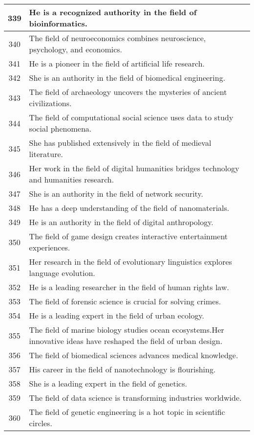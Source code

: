 \begin{longtable}{|c|p{12cm}|}
339 & He is a recognized authority in the field of bioinformatics. \\ \hline
340 & The field of neuroeconomics combines neuroscience, psychology, and economics. \\ \hline
341 & He is a pioneer in the field of artificial life research. \\ \hline
342 & She is an authority in the field of biomedical engineering. \\ \hline
343 & The field of archaeology uncovers the mysteries of ancient civilizations. \\ \hline
344 & The field of computational social science uses data to study social phenomena. \\ \hline
345 & She has published extensively in the field of medieval literature. \\ \hline
346 & Her work in the field of digital humanities bridges technology and humanities research. \\ \hline
347 & She is an authority in the field of network security. \\ \hline
348 & He has a deep understanding of the field of nanomaterials. \\ \hline
349 & He is an authority in the field of digital anthropology. \\ \hline
350 & The field of game design creates interactive entertainment experiences. \\ \hline
351 & Her research in the field of evolutionary linguistics explores language evolution. \\ \hline
352 & He is a leading researcher in the field of human rights law. \\ \hline
353 & The field of forensic science is crucial for solving crimes. \\ \hline
354 & He is a leading expert in the field of urban ecology. \\ \hline
355 & The field of marine biology studies ocean ecosystems.Her innovative ideas have reshaped the field of urban design. \\ \hline
356 & The field of biomedical sciences advances medical knowledge. \\ \hline
357 & His career in the field of nanotechnology is flourishing. \\ \hline
358 & She is a leading expert in the field of genetics. \\ \hline
359 & The field of data science is transforming industries worldwide. \\ \hline
360 & The field of genetic engineering is a hot topic in scientific circles. \\ \hline

\end{longtable}
